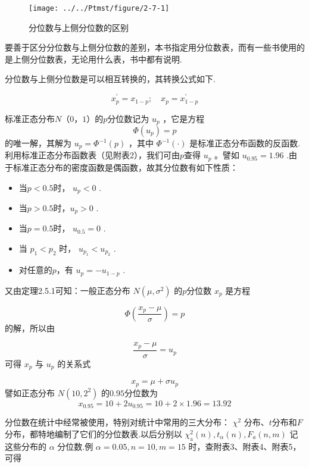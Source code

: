 \begin{figure}
	\centering
	\texttt{[image: ../../Ptmst/figure/2-7-1]}
	\caption{分位数与上侧分位数的区别}
	\label{fig:2-7-1}
\end{figure}

要善于区分分位数与上侧分位数的差别，本书指定用分位数表，而有一些书使用的是上侧分位数表，无论用什么表，书中都有说明.

分位数与上侧分位数是可以相互转换的，其转换公式如下.

\begin{equation}
x_{p}^{\prime}=x_{1-p} ; \quad x_{p}=x_{1-p}^{\prime} \label{eq:2.7.6}
\end{equation}

\begin{example}
	标准正态分布$ N（0，1） $的$ p $分位数记为 $u_{p}$ ，它是方程
	\[
	\Phi\left(u_{p}\right)=p
	\]
	的唯一解，其解为 $u_{p}=\Phi^{-1}(p)$ ，其中 $\Phi^{-1}(\cdot)$ 是标准正态分布函数的反函数.利用标准正态分布函数表（见附表2），我们可由$ p $查得 $u_{p}$ 。譬如 $u_{0.95}=1.96$ .由于标准正态分布的密度函数是偶函数，故其分位数有如下性质：
	
	\begin{itemize}
		\item 当$ p<0.5 $时， $u_{p}<0$ .
		\item 当$ p>0.5 $时，$u_{p}>0$ .
		\item 当$ p=0.5 $时， $u_{0.5}=0$ .
		\item 当 $p_{1}<p_{2}$ 时， $u_{p_{1}}<u_{p_{2}}$ .
		\item 对任意的$ p $，有 $u_{p}=-u_{1-p}$ .
	\end{itemize}
	
	又由定理2.5.1可知：一般正态分布 $N\left(\mu, \sigma^{2}\right)$ 的$ p $分位数 $x_{p}$ 是方程
	
	\[
	\Phi\left(\frac{x_{p}-\mu}{\sigma}\right)=p
	\]
	的解，所以由
	
	\[
	\frac{x_{p}-\mu}{\sigma}=u_{p}
	\]
	可得 $x_{p}$ 与 $u_{p}$ 的关系式
	
	\begin{equation}
	x_{p}=\mu+\sigma u_{p} \label{eq:2.7.7}
	\end{equation}
	譬如正态分布 $N\left(10,2^{2}\right)$ 的$ 0.95 $分位数为
	\[
	x_{0.95}=10+2 u_{0.95}=10+2 \times 1.96=13.92
	\]
\end{example}

分位数在统计中经常被使用，特别对统计中常用的三大分布： $\chi^{2}$ 分布、$ t $分布和$ F $分布，都特地编制了它们的分位数表.以后分别以 $\chi_{\mathrm{a}}^{2}(n), t_{\alpha}(n) , F_{a}(n, m) $ 记这些分布的 $\alpha$ 分位数.例 $\alpha=0.05, n=10, m=15$ 时，查附表3、附表4、附表5，可得

